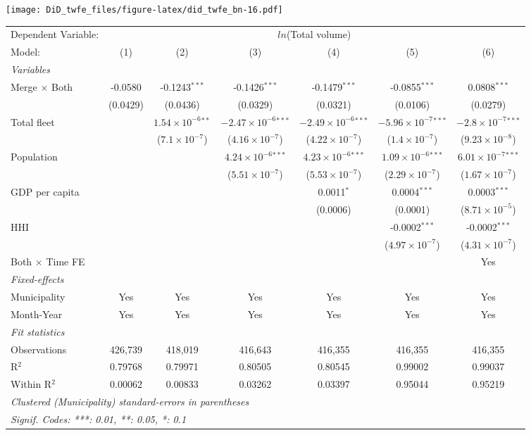 \documentclass[
]{article}
\begin{document}
\texttt{[image: DiD\_twfe\_files/figure-latex/did\_twfe\_bn-16.pdf]}

\begin{tabular}{lcccccc}
\tabularnewline\midrule\midrule
Dependent Variable:&\multicolumn{6}{c}{$ln$(Total volume)}\\
Model:&(1) & (2) & (3) & (4) & (5) & (6)\\
\midrule \emph{Variables}&   &   &   &   &   &  \\
Merge $\times $ Both & -0.0580 & -0.1243$^{***}$ & -0.1426$^{***}$ & -0.1479$^{***}$ & -0.0855$^{***}$ & 0.0808$^{***}$\\
  &(0.0429) & (0.0436) & (0.0329) & (0.0321) & (0.0106) & (0.0279)\\
Total fleet &    & $1.54\times 10^{-6}$$^{**}$ & $-2.47\times 10^{-6}$$^{***}$ & $-2.49\times 10^{-6}$$^{***}$ & $-5.96\times 10^{-7}$$^{***}$ & $-2.8\times 10^{-7}$$^{***}$\\
  &   & ($7.1\times 10^{-7}$) & ($4.16\times 10^{-7}$) & ($4.22\times 10^{-7}$) & ($1.4\times 10^{-7}$) & ($9.23\times 10^{-8}$)\\
Population &    &    & $4.24\times 10^{-6}$$^{***}$ & $4.23\times 10^{-6}$$^{***}$ & $1.09\times 10^{-6}$$^{***}$ & $6.01\times 10^{-7}$$^{***}$\\
  &   &    & ($5.51\times 10^{-7}$) & ($5.53\times 10^{-7}$) & ($2.29\times 10^{-7}$) & ($1.67\times 10^{-7}$)\\
GDP per capita &    &    &    & 0.0011$^{*}$ & 0.0004$^{***}$ & 0.0003$^{***}$\\
  &   &    &    & (0.0006) & (0.0001) & ($8.71\times 10^{-5}$)\\
HHI &    &    &    &    & -0.0002$^{***}$ & -0.0002$^{***}$\\
  &   &    &    &    & ($4.97\times 10^{-7}$) & ($4.31\times 10^{-7}$)\\
Both $\times$ Time FE &  &  &  &  &  & Yes\\
\midrule \emph{Fixed-effects}&   &   &   &   &   &  \\
Municipality & Yes & Yes & Yes & Yes & Yes & Yes\\
Month-Year & Yes & Yes & Yes & Yes & Yes & Yes\\
\midrule \emph{Fit statistics}&  & & & & & \\
Observations & 426,739&418,019&416,643&416,355&416,355&416,355\\
R$^2$ & 0.79768&0.79971&0.80505&0.80545&0.99002&0.99037\\
Within R$^2$ & 0.00062&0.00833&0.03262&0.03397&0.95044&0.95219\\
\midrule\midrule\multicolumn{7}{l}{\emph{Clustered (Municipality) standard-errors in parentheses}}\\
\multicolumn{7}{l}{\emph{Signif. Codes: ***: 0.01, **: 0.05, *: 0.1}}\\
\end{tabular}
\end{document}
